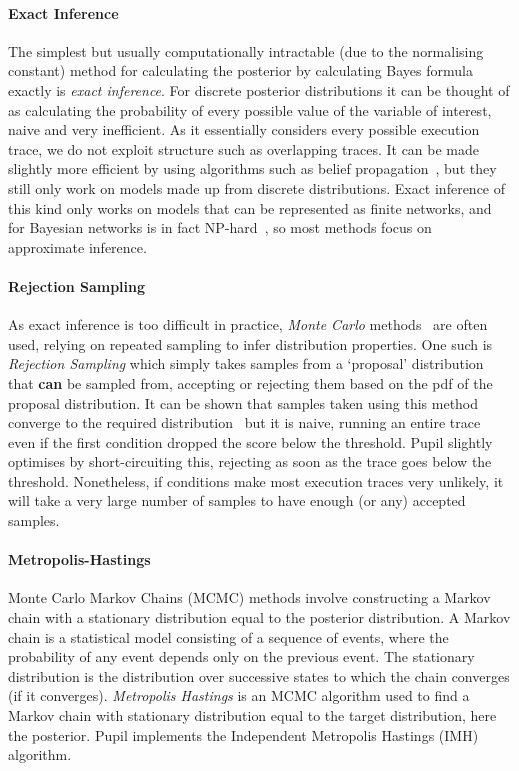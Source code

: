 \documentclass[sigconf]{acmart}
\newcommand{\pupil}{Pupil\xspace}
\begin{document}
\paragraph{Exact Inference}
The simplest but usually computationally intractable (due to the normalising constant) method for calculating the posterior by calculating Bayes formula exactly is \emph{exact inference}. For discrete posterior distributions it can be thought of as calculating the probability of every possible value of the variable of interest, naive and very inefficient. As it essentially considers every possible execution trace, we do not exploit structure such as overlapping traces. It can be made slightly more efficient by using algorithms such as belief propagation~\cite{belief-prop}, but they still only work on models made up from discrete distributions. Exact inference of this kind only works on models that can be represented as finite networks, and for Bayesian networks is in fact NP-hard~\cite{cooper1990computational}, so most methods focus on approximate inference.

\paragraph{Rejection Sampling}
As exact inference is too difficult in practice, \emph{Monte Carlo} methods~\cite{monte-carlo} are often used, relying on repeated sampling to infer distribution properties. One such is \emph{Rejection Sampling} which simply takes samples from a `proposal' distribution that {\bf can} be sampled from, accepting or rejecting them based on the pdf of the proposal distribution. It can be shown that samples taken using this method converge to the required distribution~\cite{flury1990acceptance} but it is naive, running an entire trace even if the first condition dropped the score below the threshold. \pupil slightly optimises by short-circuiting this, rejecting as soon as the trace goes below the threshold. Nonetheless, if conditions make most execution traces very unlikely, it will take a very large number of samples to have enough (or any) accepted samples.

\paragraph{Metropolis-Hastings}
Monte Carlo Markov Chains (MCMC) methods involve constructing a Markov chain with a stationary distribution equal to the posterior distribution. A Markov chain is a statistical model consisting of a sequence of events, where the probability of any event depends only on the previous event. The stationary distribution is the distribution over successive states to which the chain converges (if it converges). \emph{Metropolis Hastings} is an MCMC algorithm used to find a Markov chain with stationary distribution equal to the target distribution, here the posterior. \pupil implements the Independent Metropolis Hastings (IMH) algorithm.
\end{document}
